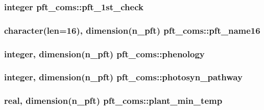 \subsubsection[{\texorpdfstring{pft\+\_\+1st\+\_\+check}{pft_1st_check}}]{\setlength{\rightskip}{0pt plus 5cm}integer pft\+\_\+coms\+::pft\+\_\+1st\+\_\+check}\hypertarget{namespacepft__coms_a46f15da0b9bf81a4f8bdba850efff1c8}{}\label{namespacepft__coms_a46f15da0b9bf81a4f8bdba850efff1c8}
\subsubsection[{\texorpdfstring{pft\+\_\+name16}{pft_name16}}]{\setlength{\rightskip}{0pt plus 5cm}character(len=16), dimension(n\+\_\+pft) pft\+\_\+coms\+::pft\+\_\+name16}\hypertarget{namespacepft__coms_abbfea830303582f918e1630cb7009694}{}\label{namespacepft__coms_abbfea830303582f918e1630cb7009694}
\subsubsection[{\texorpdfstring{phenology}{phenology}}]{\setlength{\rightskip}{0pt plus 5cm}integer, dimension(n\+\_\+pft) pft\+\_\+coms\+::phenology}\hypertarget{namespacepft__coms_a5a3bbf23e4825378c0f3c8bd788c6c68}{}\label{namespacepft__coms_a5a3bbf23e4825378c0f3c8bd788c6c68}
\subsubsection[{\texorpdfstring{photosyn\+\_\+pathway}{photosyn_pathway}}]{\setlength{\rightskip}{0pt plus 5cm}integer, dimension(n\+\_\+pft) pft\+\_\+coms\+::photosyn\+\_\+pathway}\hypertarget{namespacepft__coms_a697c05e70b11e609bd5316b8eed821ed}{}\label{namespacepft__coms_a697c05e70b11e609bd5316b8eed821ed}
\subsubsection[{\texorpdfstring{plant\+\_\+min\+\_\+temp}{plant_min_temp}}]{\setlength{\rightskip}{0pt plus 5cm}real, dimension(n\+\_\+pft) pft\+\_\+coms\+::plant\+\_\+min\+\_\+temp}\hypertarget{namespacepft__coms_ae13d0f409c782cf00abbc9f09f55a5a8}{}\label{namespacepft__coms_ae13d0f409c782cf00abbc9f09f55a5a8}

